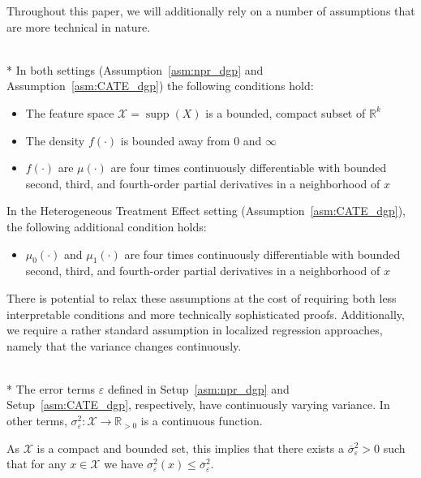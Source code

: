 Throughout this paper, we will additionally rely on a number of assumptions that are more technical in nature.
\begin{boxD}
	\begin{asm}\label{asm:technical}\mbox{}\\*
		In both settings (Assumption~\ref{asm:npr_dgp} and Assumption~\ref{asm:CATE_dgp}) the following conditions hold:
		\begin{itemize}
			\item The feature space $\mathcal{X} = \operatorname{supp}(X)$ is a bounded, compact subset of $\mathbb{R}^k$
			\item The density $f(\cdot)$ is bounded away from 0 and $\infty$
			\item $f(\cdot)$ are $\mu(\cdot)$ are four times continuously differentiable with bounded second, third, and fourth-order partial derivatives in a neighborhood of $x$
		\end{itemize}
		In the Heterogeneous Treatment Effect setting (Assumption~\ref{asm:CATE_dgp}), the following additional condition holds:
		\begin{itemize}
			\item $\mu_0(\cdot)$ and $\mu_1(\cdot)$ are four times continuously differentiable with bounded second, third, and fourth-order partial derivatives in a neighborhood of $x$
		\end{itemize}
	\end{asm}
\end{boxD}
There is potential to relax these assumptions at the cost of requiring both less interpretable conditions and more technically sophisticated proofs.
Additionally, we require a rather standard assumption in localized regression approaches, namely that the variance changes continuously.
\begin{boxD}
	\begin{asm}\label{asm:errors}\mbox{}\\*
		The error terms $\varepsilon$ defined in Setup~\ref{asm:npr_dgp} and Setup~\ref{asm:CATE_dgp}, respectively, have continuously varying variance.
		In other terms,	$\sigma^2_{\varepsilon}: \mathcal{X} \rightarrow \mathbb{R}_{>0}$ is a continuous function.
	\end{asm}
\end{boxD}
As $\mathcal{X}$ is a compact and bounded set, this implies that there exists a $\overline{\sigma}_{\varepsilon}^2 > 0$ such that for any $x \in \mathcal{X}$ we have $\sigma^{2}_{\varepsilon}\left(x\right) \leq \overline{\sigma}_{\varepsilon}^2$.
